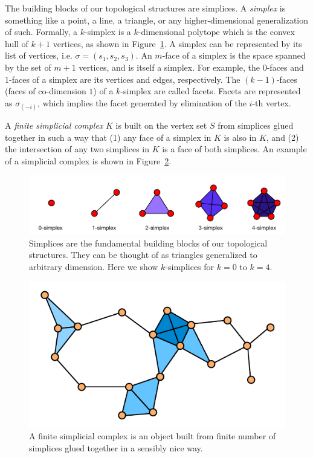 The building blocks of our topological structures are simplices.
A \emph{simplex} is something like a point, a line, a triangle, or any higher-dimensional generalization of such.
Formally, a $k$-simplex is a $k$-dimensional polytope which is the convex hull of $k+1$ vertices, as shown in Figure~\ref{fig:bg:simplices}.
A simplex can be represented by its list of vertices, i.e. $\sigma=(s_{1},s_{2},s_{3})$.
An $m$-face of a simplex is the space spanned by the set of $m+1$ vertices, and is itself a simplex.
For example, the $0$-faces and $1$-faces of a simplex are its vertices and edges, respectively.
The $(k-1)$-faces (faces of co-dimension $1$) of a $k$-simplex are called facets.
Facets are represented as $\sigma_{(-i)}$, which implies the facet generated by elimination of the $i$-th vertex.

A \emph{finite simplicial complex} $K$ is built on the vertex set $S$ from simplices glued together in such a way that (1) any face of a simplex in $K$ is also in $K$, and (2) the intersection of any two simplices in $K$ is a face of both simplices.
An example of a simplicial complex is shown in Figure~\ref{fig:bg:simplicial_complex}.

\begin{figure}
\centering
\includegraphics[]{./fig/background/simplices.pdf}
\caption[Simplices: The building blocks of topological complexes]{Simplices are the fundamental building blocks of our topological structures. They can be thought of as triangles generalized to arbitrary dimension. Here we show $k$-simplices for $k=0$ to $k=4$.}
\label{fig:bg:simplices}
\end{figure}

\begin{figure}
\centering
\includegraphics[]{./fig/background/simplicial_complex.pdf}
\caption[Simplicial Complex: A discrete topological space]{A finite simplicial complex is an object built from finite number of simplices glued together in a sensibly nice way.}
\label{fig:bg:simplicial_complex}
\end{figure}

